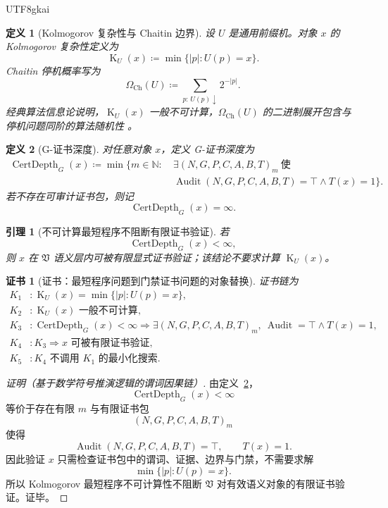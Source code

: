 \documentclass[12pt]{article}
\newtheorem{definition}{定义}[section]
\newtheorem{lemma}{引理}[section]
\newtheorem{Certificate}{证书}[section]
\newcommand{\NN}{\mathbb{N}}
\newcommand{\Vsys}{\mathfrak V}
\newcommand{\DefEq}{\coloneqq}
\newcommand{\OmegaCh}{\Omega_{\mathrm{Ch}}}
\DeclareMathOperator{\Audit}{Audit}
\DeclareMathOperator{\KComplex}{K}
\DeclareMathOperator{\CertDepth}{CertDepth}
\begin{document}
\begin{CJK*}{UTF8}{gkai}
\begin{definition}[Kolmogorov 复杂性与 Chaitin 边界]
\label{def:tex59-kolmogorov-chaitin}
设 \(U\) 是通用前缀机。对象 \(x\) 的 Kolmogorov 复杂性定义为
\[
  \KComplex_U(x)
  \DefEq
  \min\{|p|:U(p)=x\}.
\]
Chaitin 停机概率写为
\[
  \OmegaCh(U)
  \DefEq
  \sum_{p:\,U(p)\downarrow}2^{-|p|}.
\]
经典算法信息论说明，\(\KComplex_U(x)\) 一般不可计算，\(\OmegaCh(U)\) 的二进制展开包含与停机问题同阶的算法随机性
\cite{Kolmogorov1965Info,Chaitin1975ProgramSize,LiVitanyi2008Kolmogorov}。
\end{definition}

\begin{definition}[G-证书深度]
\label{def:tex59-cert-depth}
对任意对象 \(x\)，定义 G-证书深度为
\[
  \begin{aligned}
  \CertDepth_G(x)
  \DefEq
  \min\{m\in\NN:\ &
  \exists (N,G,P,C,A,B,T)_m\ \text{使}\\
  &\Audit(N,G,P,C,A,B,T)=\top
  \wedge T(x)=1\}.
  \end{aligned}
\]
若不存在可审计证书包，则记
\[
  \CertDepth_G(x)=\infty.
\]
\end{definition}

\begin{lemma}[不可计算最短程序不阻断有限证书验证]
\label{lem:tex59-k-not-block-cert}
若
\[
  \CertDepth_G(x)<\infty,
\]
则 \(x\) 在 \(\Vsys\) 语义层内可被有限显式证书验证；该结论不要求计算 \(\KComplex_U(x)\)。
\end{lemma}

\begin{Certificate}[证书：最短程序问题到门禁证书问题的对象替换]
\label{cert:tex59-k-not-block-cert}
证书链为
\[
\begin{aligned}
  K_1 &: \KComplex_U(x)=\min\{|p|:U(p)=x\},\\
  K_2 &: \KComplex_U(x)\text{ 一般不可计算},\\
  K_3 &: \CertDepth_G(x)<\infty
  \Rightarrow
  \exists (N,G,P,C,A,B,T)_m,\ \Audit=\top\wedge T(x)=1,\\
  K_4 &: K_3\Rightarrow x\text{ 可被有限证书验证},\\
  K_5 &: K_4\text{ 不调用 }K_1\text{ 的最小化搜索}.
\end{aligned}
\]
\end{Certificate}

\begin{proof}[证明（基于数学符号推演逻辑的谓词因果链）]
由定义~\ref{def:tex59-cert-depth}，
\[
  \CertDepth_G(x)<\infty
\]
等价于存在有限 \(m\) 与有限证书包
\[
  (N,G,P,C,A,B,T)_m
\]
使得
\[
  \Audit(N,G,P,C,A,B,T)=\top,
  \qquad
  T(x)=1.
\]
因此验证 \(x\) 只需检查证书包中的谓词、证据、边界与门禁，不需要求解
\[
  \min\{|p|:U(p)=x\}.
\]
所以 Kolmogorov 最短程序不可计算性不阻断 \(\Vsys\) 对有效语义对象的有限证书验证。证毕。
\end{proof}


\end{CJK*}
\end{document}
